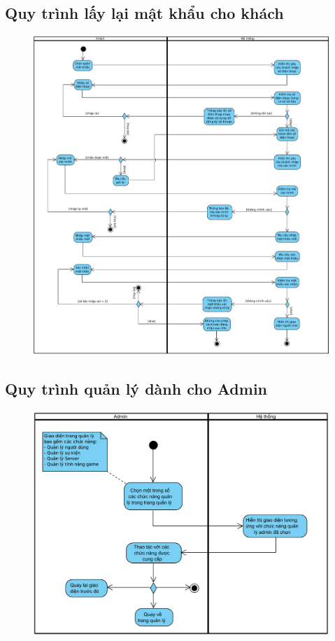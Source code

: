 \documentclass[3p]{elsarticle}
\begin{document}
\subsection{Quy trình lấy lại mật khẩu cho khách}
\begin{figure}[!htbp]
	\centering
	\includegraphics[scale=.5]{images/activities/forgetPass.pdf}
\end{figure}
%
\newpage
\subsection{Quy trình quản lý dành cho Admin}
\begin{figure}[!htbp]
	\centering
	\includegraphics[scale=.65]{images/activities/manage.pdf}
\end{figure}
%
\newpage
\end{document}
